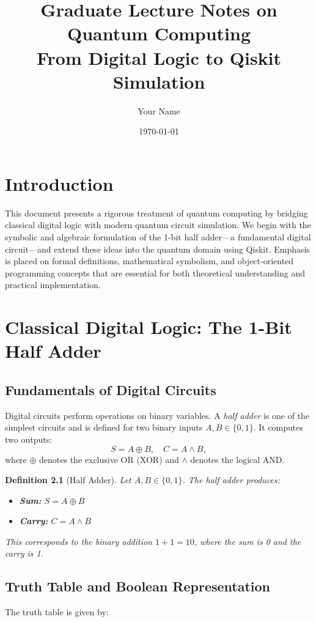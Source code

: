\documentclass[12pt]{book}
\title{Graduate Lecture Notes on Quantum Computing\\[1ex]From Digital Logic to Qiskit Simulation}
\author{Your Name}
\date{\today}
\newtheorem{definition}{Definition}[chapter]
\theoremstyle{remark}
\begin{document}
	\maketitle
	\tableofcontents
	
	\chapter{Introduction}
	This document presents a rigorous treatment of quantum computing by bridging classical digital logic with modern quantum circuit simulation. We begin with the symbolic and algebraic formulation of the 1-bit half adder—a fundamental digital circuit—and extend these ideas into the quantum domain using Qiskit. Emphasis is placed on formal definitions, mathematical symbolism, and object‐oriented programming concepts that are essential for both theoretical understanding and practical implementation.
	
	\chapter{Classical Digital Logic: The 1-Bit Half Adder}
	\section{Fundamentals of Digital Circuits}
	Digital circuits perform operations on binary variables. A \emph{half adder} is one of the simplest circuits and is defined for two binary inputs \( A, B \in \{0,1\} \). It computes two outputs:
	\[
	S = A \oplus B, \quad C = A \wedge B,
	\]
	where \(\oplus\) denotes the exclusive OR (XOR) and \(\wedge\) denotes the logical AND.
	
	\begin{definition}[Half Adder]
		Let \(A, B \in \{0,1\}\). The \emph{half adder} produces:
		\begin{itemize}
			\item \textbf{Sum:} \( S = A \oplus B \)
			\item \textbf{Carry:} \( C = A \wedge B \)
		\end{itemize}
		This corresponds to the binary addition \(1+1=10\), where the sum is 0 and the carry is 1.
	\end{definition}
	
	\section{Truth Table and Boolean Representation}
	The truth table is given by:
	
\end{document}
